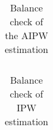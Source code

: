 \begin{table}
	\begin{tabular}{lcccc}
		 \hline \hline
	
	 \hline \hline
	\end{tabular}
	\caption{Balance check of the AIPW estimation}
	\label{bal_type_aipw}
\end{table}

\begin{table}
	\begin{tabular}{lcccc}
		 \hline \hline
		
		 \hline \hline
	\end{tabular}
	\caption{Balance check of IPW estimation } 
	\label{bal_type_ipw}
\end{table}